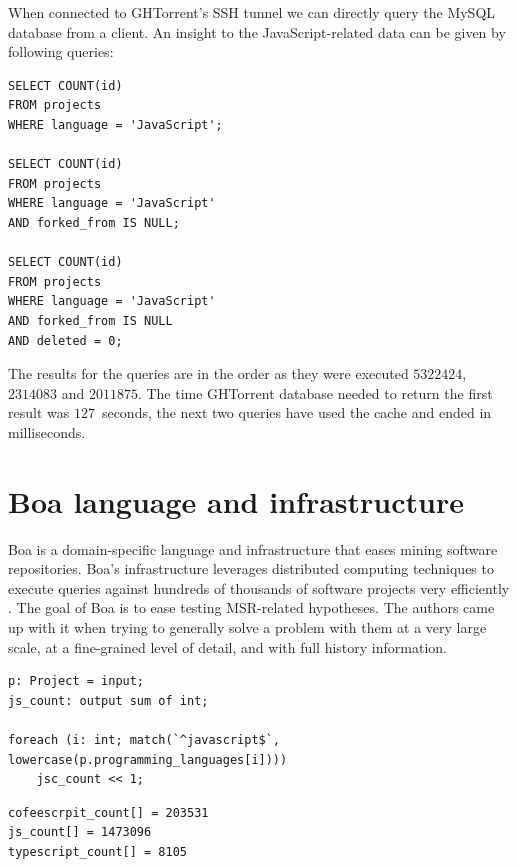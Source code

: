 \documentclass[thesis=M,english]{FITthesis}[2012/10/20]
\begin{document}
When connected to GHTorrent's SSH tunnel we can directly query the MySQL database from a client. An insight to the JavaScript-related data can be given by following queries: \\

\lstset{title=Querying GHTorrent for the counts of JavaScript repositories}
\begin{lstlisting}[basicstyle=\small]
SELECT COUNT(id)
FROM projects
WHERE language = 'JavaScript';

SELECT COUNT(id)
FROM projects
WHERE language = 'JavaScript'
AND forked_from IS NULL;

SELECT COUNT(id)
FROM projects
WHERE language = 'JavaScript'
AND forked_from IS NULL
AND deleted = 0;
\end{lstlisting}

The results for the queries are in the order as they were executed $5322424$, $2314083$ and $2011875$. The time GHTorrent database needed to return the first result was $127$ seconds, the next two queries have used the cache and ended in milliseconds. \\

\section{Boa language and infrastructure}

Boa is a domain-specific language and infrastructure that eases mining software repositories. Boa's infrastructure leverages distributed computing techniques to execute queries against hundreds of thousands of software projects very efficiently \cite{boa_web}. The goal of Boa is to ease testing MSR-related hypotheses. The authors came up with it when trying to generally solve a problem with them at a very large scale, at a fine-grained level of detail, and with full history information. \cite{boa_intro}

\lstset{title=Counting projects in a specific language}
\begin{lstlisting}[basicstyle=\tiny]
p: Project = input;
js_count: output sum of int;

foreach (i: int; match(`^javascript$`, lowercase(p.programming_languages[i])))
    jsc_count << 1;
\end{lstlisting}

\lstset{title=The output of Boa job 50839}
\begin{lstlisting}[basicstyle=\tiny]
cofeescrpit_count[] = 203531
js_count[] = 1473096
typescript_count[] = 8105
\end{lstlisting}
\end{document}
